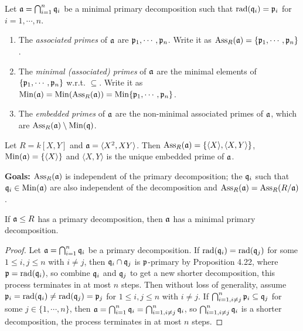 \begin{definition}
    Let $\mathfrak{a} = \bigcap_{i=1}^{n} \mathfrak{q}_i$ be a minimal primary decomposition such that $\operatorname{rad}(\mathfrak{q}_i) = \mathfrak{p}_i$ for $i = 1,\cdots,n$.
    \begin{enumerate}
        \item The \emph{associated primes} of $\mathfrak{a}$ are $\mathfrak{p}_1,\cdots,\mathfrak{p}_n$. Write it as $\operatorname{Ass}_R(\mathfrak{a}) = \{\mathfrak{p}_1,\cdots,\mathfrak{p}_n\}$.
        \item The \emph{minimal (associated) primes} of $\mathfrak{a}$ are the minimal elements of $\{\mathfrak{p}_1,\cdots,\mathfrak{p}_n\}$ w.r.t. $\subseteq$. Write it as $\operatorname{Min}(\mathfrak{a}) = \operatorname{Min}(\operatorname{Ass}_R(\mathfrak{a})) = \operatorname{Min}\{\mathfrak{p}_1,\cdots,\mathfrak{p}_n\}$.
        \item The \emph{embedded primes} of $\mathfrak{a}$ are the non-minimal associated primes of $\mathfrak{a}$, which are $\operatorname{Ass}_R(\mathfrak{a}) \setminus \operatorname{Min}(\mathfrak{q})$.
    \end{enumerate}
\end{definition}

\begin{example}
    Let $R = k[X,Y]$ and $\mathfrak{a} = \langle X^{2},XY \rangle$. Then $\operatorname{Ass}_R(\mathfrak{a}) = \{\langle X \rangle, \langle X,Y \rangle\}$, $\operatorname{Min}(\mathfrak{a}) = \{\langle X \rangle\}$ and $\langle X,Y \rangle$ is the unique embedded prime of $\mathfrak{a}$.
\end{example}

\noindent \textbf{Goals:} $\operatorname{Ass}_R(\mathfrak{a})$ is independent of the primary decomposition; the $\mathfrak{q}_i$ such that $\mathfrak{q}_i \in \operatorname{Min}(\mathfrak{a})$ are also independent of the decomposition and $\operatorname{Ass}_R(\mathfrak{a}) = \operatorname{Ass}_R(R/\mathfrak{a})$.

\begin{proposition}
    If $\mathfrak{a} \leq R$ has a primary decomposition, then $\mathfrak{a}$ has a minimal primary decomposition.
\end{proposition}

\begin{proof}
    Let $\mathfrak{a} = \bigcap_{i=1}^{n} \mathfrak{q}_i$ be a primary decomposition. If $\operatorname{rad}(\mathfrak{q}_i) = \operatorname{rad}(\mathfrak{q}_j)$ for some $1 \leq i,j \leq n$ with $i \neq j$, then $\mathfrak{q}_i \cap \mathfrak{q}_j$ is $\mathfrak{p}$-primary by Proposition 4.22, where $\mathfrak{p} = \operatorname{rad}(\mathfrak{q}_i)$, so combine $\mathfrak{q}_i$ and $\mathfrak{q}_j$ to get a new shorter decomposition, this process terminates in at most $n$ steps. Then without loss of generality, assume $\mathfrak{p}_i = \operatorname{rad}(\mathfrak{q}_i) \neq \operatorname{rad}(\mathfrak{q}_j) = \mathfrak{p}_j$ for $1 \leq i,j \leq n$ with $i \neq j$. If $\bigcap_{i=1,i\neq j}^{n} \mathfrak{p}_i \subseteq \mathfrak{q}_j$ for some $j \in \{1,\cdots,n\}$, then $\mathfrak{a} = \bigcap_{i=1}^{n} \mathfrak{q}_i = \bigcap_{i=1,i \neq j}^{n} \mathfrak{q}_i$, so $\bigcap_{i=1,i \neq j}^{n} \mathfrak{q}_i$ is a shorter decomposition, the process terminates in at most $n$ steps.
\end{proof}

